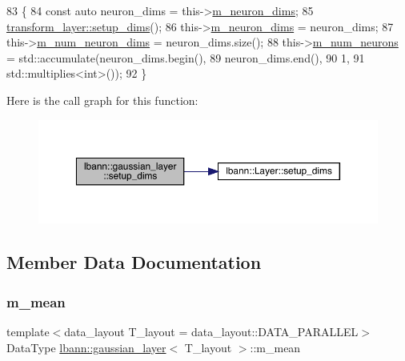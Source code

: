 \begin{DoxyCode}
83                              \{
84     \textcolor{keyword}{const} \textcolor{keyword}{auto} neuron\_dims = this->\hyperlink{classlbann_1_1Layer_abb34bb8031f57a483e2e327a5f229f48}{m\_neuron\_dims};
85     \hyperlink{classlbann_1_1Layer_a90fce1b06c1f2abb480e18cfe08a9746}{transform\_layer::setup\_dims}();
86     this->\hyperlink{classlbann_1_1Layer_abb34bb8031f57a483e2e327a5f229f48}{m\_neuron\_dims} = neuron\_dims;
87     this->\hyperlink{classlbann_1_1Layer_adfd6178d21498c9095cd947ae1eb2d6a}{m\_num\_neuron\_dims} = neuron\_dims.size();
88     this->\hyperlink{classlbann_1_1Layer_a6b5ebc8a7d9329d8a773ed787e7b41d8}{m\_num\_neurons} = std::accumulate(neuron\_dims.begin(),
89                                           neuron\_dims.end(),
90                                           1,
91                                           std::multiplies<int>());
92   \}
\end{DoxyCode}
Here is the call graph for this function\+:\nopagebreak
\begin{figure}[H]
\begin{center}
\leavevmode
\includegraphics[width=350pt]{classlbann_1_1gaussian__layer_ab48263a742e407a8d3586ee4ece38768_cgraph}
\end{center}
\end{figure}


\subsection{Member Data Documentation}
\mbox{\label{classlbann_1_1gaussian__layer_a397a47df5968e58fd1fcbfcdc2a3a620}} 
\subsubsection{\texorpdfstring{m\+\_\+mean}{m\_mean}}
{\footnotesize\ttfamily template$<$data\+\_\+layout T\+\_\+layout = data\+\_\+layout\+::\+D\+A\+T\+A\+\_\+\+P\+A\+R\+A\+L\+L\+EL$>$ \\
Data\+Type \hyperlink{classlbann_1_1gaussian__layer}{lbann\+::gaussian\+\_\+layer}$<$ T\+\_\+layout $>$\+::m\+\_\+mean\hspace{0.3cm}{\ttfamily [private]}}

